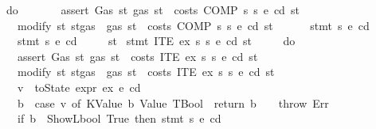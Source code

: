 \begin{isabellebody}
\ \ \ \ {\isacharparenleft}{\kern0pt}do\ {\isacharbraceleft}{\kern0pt}\isanewline
\ \ \ \ \ \ assert\ Gas\ {\isacharparenleft}{\kern0pt}{\isasymlambda}st{\isachardot}{\kern0pt}\ gas\ st\ {\isachargreater}{\kern0pt}\ costs\ {\isacharparenleft}{\kern0pt}COMP\ s{}\ s{}{\isacharparenright}{\kern0pt}\ e\ cd\ st{\isacharparenright}{\kern0pt}{\isacharsemicolon}{\kern0pt}\isanewline
\ \ \ \ \ \ modify\ {\isacharparenleft}{\kern0pt}{\isasymlambda}st{\isachardot}{\kern0pt}\ st{\isasymlparr}gas\ {\isacharcolon}{\kern0pt}{\isacharequal}{\kern0pt}\ gas\ st\ {\isacharminus}{\kern0pt}\ costs\ {\isacharparenleft}{\kern0pt}COMP\ s{}\ s{}{\isacharparenright}{\kern0pt}\ e\ cd\ st{\isasymrparr}{\isacharparenright}{\kern0pt}{\isacharsemicolon}{\kern0pt}\isanewline
\ \ \ \ \ \ stmt\ s{}\ e\ cd{\isacharsemicolon}{\kern0pt}\isanewline
\ \ \ \ \ \ stmt\ s{}\ e\ cd\isanewline
\ \ \ \ {\isacharbraceright}{\kern0pt}{\isacharparenright}{\kern0pt}\ st{\isachardoublequoteclose}\isanewline
{\isacharbar}{\kern0pt}\ {\isachardoublequoteopen}stmt\ {\isacharparenleft}{\kern0pt}ITE\ ex\ s{}\ s{}{\isacharparenright}{\kern0pt}\ e\ cd\ st\ {\isacharequal}{\kern0pt}\isanewline
\ \ \ \ {\isacharparenleft}{\kern0pt}do\ {\isacharbraceleft}{\kern0pt}\isanewline
\ \ \ \ \ \ assert\ Gas\ {\isacharparenleft}{\kern0pt}{\isasymlambda}st{\isachardot}{\kern0pt}\ gas\ st\ {\isachargreater}{\kern0pt}\ costs\ {\isacharparenleft}{\kern0pt}ITE\ ex\ s{}\ s{}{\isacharparenright}{\kern0pt}\ e\ cd\ st{\isacharparenright}{\kern0pt}{\isacharsemicolon}{\kern0pt}\isanewline
\ \ \ \ \ \ modify\ {\isacharparenleft}{\kern0pt}{\isasymlambda}st{\isachardot}{\kern0pt}\ st{\isasymlparr}gas\ {\isacharcolon}{\kern0pt}{\isacharequal}{\kern0pt}\ gas\ st\ {\isacharminus}{\kern0pt}\ costs\ {\isacharparenleft}{\kern0pt}ITE\ ex\ s{}\ s{}{\isacharparenright}{\kern0pt}\ e\ cd\ st{\isasymrparr}{\isacharparenright}{\kern0pt}{\isacharsemicolon}{\kern0pt}\isanewline
\ \ \ \ \ \ v\ {\isasymleftarrow}\ toState\ {\isacharparenleft}{\kern0pt}expr\ ex\ e\ cd{\isacharparenright}{\kern0pt}{\isacharsemicolon}{\kern0pt}\isanewline
\ \ \ \ \ \ b\ {\isasymleftarrow}\ {\isacharparenleft}{\kern0pt}case\ v\ of\ {\isacharparenleft}{\kern0pt}KValue\ b{\isacharcomma}{\kern0pt}\ Value\ TBool{\isacharparenright}{\kern0pt}\ {\isasymRightarrow}\ return\ b\ {\isacharbar}{\kern0pt}\ {\isacharunderscore}{\kern0pt}\ {\isasymRightarrow}\ throw\ Err{\isacharparenright}{\kern0pt}{\isacharsemicolon}{\kern0pt}\isanewline
\ \ \ \ \ \ if\ b\ {\isacharequal}{\kern0pt}\ ShowL\isactrlsub b\isactrlsub o\isactrlsub o\isactrlsub l\ True\ then\ stmt\ s{}\ e\ cd\isanewline

\end{isabellebody}

